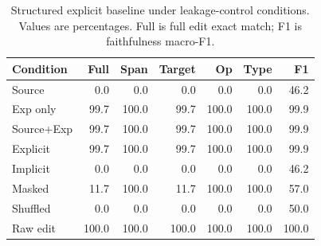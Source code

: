 \begin{table}[t]
\centering
\scriptsize
\setlength{\tabcolsep}{3pt}
\begin{tabular}{lrrrrrr}
\toprule
Condition & Full & Span & Target & Op & Type & F1 \\
\midrule
Source & 0.0 & 0.0 & 0.0 & 0.0 & 0.0 & 46.2 \\
Exp only & 99.7 & 100.0 & 99.7 & 100.0 & 100.0 & 99.9 \\
Source+Exp & 99.7 & 100.0 & 99.7 & 100.0 & 100.0 & 99.9 \\
Explicit & 99.7 & 100.0 & 99.7 & 100.0 & 100.0 & 99.9 \\
Implicit & 0.0 & 0.0 & 0.0 & 0.0 & 0.0 & 46.2 \\
Masked & 11.7 & 100.0 & 11.7 & 100.0 & 100.0 & 57.0 \\
Shuffled & 0.0 & 0.0 & 0.0 & 0.0 & 0.0 & 50.0 \\
Raw edit & 100.0 & 100.0 & 100.0 & 100.0 & 100.0 & 100.0 \\
\bottomrule
\end{tabular}
\caption{Structured explicit baseline under leakage-control conditions. Values are percentages. Full is full edit exact match; F1 is faithfulness macro-F1.}
\label{tab:leakage-structured}
\end{table}
